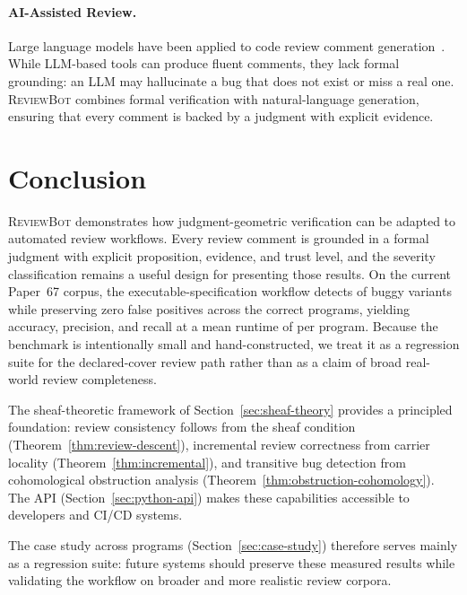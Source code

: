 \documentclass[11pt]{article}
\newcommand{\ReviewBot}{\textsc{ReviewBot}}
\begin{document}
\paragraph{AI-Assisted Review.}
Large language models have been applied to code review comment
generation~\cite{li2022codereviewer}. While LLM-based tools can
produce fluent comments, they lack formal grounding: an LLM may
hallucinate a bug that does not exist or miss a real one. \ReviewBot{}
combines formal verification with natural-language generation, ensuring
that every comment is backed by a judgment with explicit evidence.

\section{Conclusion}\label{sec:conclusion}

\ReviewBot{} demonstrates how judgment-geometric verification can be adapted
to automated review workflows. Every review comment is grounded in a formal
judgment with explicit proposition, evidence, and trust level, and the
severity classification remains a useful design for presenting those results.
On the current Paper~67 corpus, the executable-specification workflow detects
\ppLXVIIdetected{} of \ppLXVIIbuggyCount{} buggy variants while preserving
zero false positives across the \ppLXVIIcorrectCount{} correct programs,
yielding \ppLXVIIaccuracyPct{} accuracy, \ppLXVIIprecision{} precision, and
\ppLXVIIrecall{} recall at a mean runtime of \ppLXVIItimeMean{} per program.
Because the benchmark is intentionally small and hand-constructed, we treat it
as a regression suite for the declared-cover review path rather than as a
claim of broad real-world review completeness.

The sheaf-theoretic framework of Section~\ref{sec:sheaf-theory} provides
a principled foundation: review consistency follows from the sheaf
condition (Theorem~\ref{thm:review-descent}), incremental review
correctness from carrier locality (Theorem~\ref{thm:incremental}), and
transitive bug detection from cohomological obstruction analysis
(Theorem~\ref{thm:obstruction-cohomology}). The \Python{} API
(Section~\ref{sec:python-api}) makes these capabilities accessible
to developers and CI/CD systems.

The case study across \ppLXVIIprogramCount{} programs
(Section~\ref{sec:case-study}) therefore serves mainly as a regression suite:
future systems should preserve these measured results while validating the
workflow on broader and more realistic review corpora.
\end{document}
